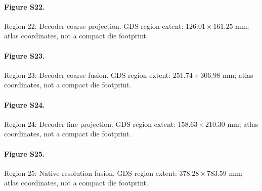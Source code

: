 \paragraph{Figure S22.} Region 22: Decoder coarse projection. GDS region extent: $126.01\times161.25$ mm; atlas coordinates, not a compact die footprint.

\paragraph{Figure S23.} Region 23: Decoder coarse fusion. GDS region extent: $251.74\times306.98$ mm; atlas coordinates, not a compact die footprint.

\paragraph{Figure S24.} Region 24: Decoder fine projection. GDS region extent: $158.63\times210.30$ mm; atlas coordinates, not a compact die footprint.

\paragraph{Figure S25.} Region 25: Native-resolution fusion. GDS region extent: $378.28\times783.59$ mm; atlas coordinates, not a compact die footprint.
